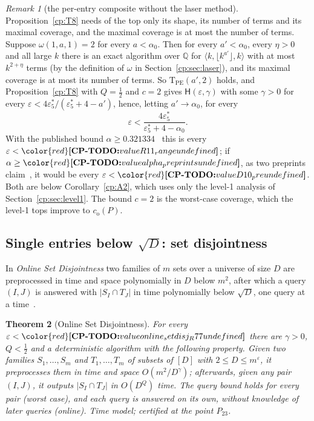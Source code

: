 \documentclass[11pt]{article}
\makeatletter
\newtheorem{theorem}{Theorem}[section]
\theoremstyle{definition}
\theoremstyle{remark}
\newtheorem{remark}[theorem]{Remark}
\DeclareRobustCommand{\CPTODO}[1]{{\color{red}\textbf{[CP-TODO:} #1\textbf{]}}}
\providecommand{\eps}{\varepsilon}
\providecommand{\Q}{\mathbb{Q}}
\newcommand{\abs}[1]{\lvert #1\rvert}
\newcommand{\mat}[3]{\langle #1,#2,#3\rangle} %
\newcommand{\Hyp}{\mathsf{H}}                 %
\newcommand{\es}{\varepsilon^*_5}             %
\newcommand{\co}{c_{\mathrm o}}               %
\newcommand{\TPE}{\mathrm{T}_{\mathrm{PE}}}   %
\newcommand{\Ptt}{P_{23}}                     %
\newcommand{\cpv}[1]{\ifcsname cpv@#1\endcsname\csname cpv@#1\endcsname\else\CPTODO{value #1 undefined}\fi}
\newcommand{\AlphaVXXZ}{0.321334}%
\makeatother
\begin{document}
\begin{remark}[the per-entry composite without the laser method]\label{cp:D10}
Proposition~\ref{cp:T8} needs of the top only its shape, its number of terms and its maximal coverage, and the maximal coverage is at most the number of terms. Suppose $\omega(1,a,1)=2$ for every $a<\alpha_0$. Then for every $a'<\alpha_0$, every $\eta>0$ and all large $k$ there is an exact algorithm over $\Q$ for $\mat k{\lfloor k^{a'}\rfloor}k$ with at most $k^{2+\eta}$ terms (by the definition of $\omega$ in Section~\ref{cp:sec:laser}), and its maximal coverage is at most its number of terms. So $\TPE(a',2)$ holds, and Proposition~\ref{cp:T8} with $Q=\frac12$ and $c=2$ gives $\Hyp(\eps,\gamma)$ with some $\gamma>0$ for every $\eps<4\es/(\es+4-a')$, hence, letting $a'\to\alpha_0$, for every
\[
\eps<\frac{4\es}{\es+4-\alpha_0}.
\]
With the published bound $\alpha\ge\AlphaVXXZ$~\cite{VXXZ24} this is every $\eps<\cpv{R11_range}$; if $\alpha\ge\cpv{alpha_preprints}$, as two preprints claim~\cite{AvdBZ26,Uzn26}, it would be every $\eps<\cpv{D10_pre}$. Both are below Corollary~\ref{cp:A2}, which uses only the level-1 analysis of Section~\ref{cp:sec:level1}. The bound $c=2$ is the worst-case coverage, which the level-1 tops improve to $\co(P)$.
\end{remark}

\subsection{Single entries below \texorpdfstring{$\sqrt D$}{sqrt D}: set disjointness}\label{cp:sec:D:setdisj}

In \emph{Online Set Disjointness} two families of $m$ sets over a universe of size $D$ are preprocessed in time and space polynomially in $D$ below $m^2$, after which a query $(I,J)$ is answered with $\abs{S_I\cap T_J}$ in time polynomially below $\sqrt D$, one query at a time~\cite{AV26}.

\begin{theorem}[Online Set Disjointness]\label{cp:D3}
For every $\eps<\cpv{online_setdisj_R77}$ there are $\gamma>0$, $Q<\frac12$ and a deterministic algorithm with the following property. Given two families $S_1,\dots,S_m$ and $T_1,\dots,T_m$ of subsets of $[D]$ with $2\le D\le m^\eps$, it preprocesses them in time and space $O(m^2/D^\gamma)$; afterwards, given any pair $(I,J)$, it outputs $\abs{S_I\cap T_J}$ in $O(D^Q)$ time. The query bound holds for every pair (worst case), and each query is answered on its own, without knowledge of later queries (online). Time model; certified at the point $\Ptt$.
\end{theorem}
\end{document}
